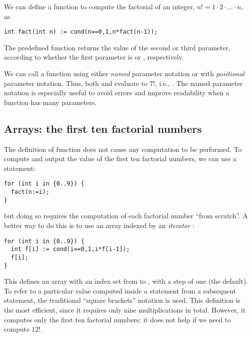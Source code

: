 We can define a function to compute the factorial of an integer,
$n! = 1 \cdot 2 \cdot \ldots \cdot n$, as
\begin{lstlisting}
int fact(int n) := cond(n==0,1,n*fact(n-1));
\end{lstlisting}
The predefined function  returns the value of the second or
third parameter, according to whether the first parameter is 
or , respectively.

We can call a function using either
\emph{named} parameter notation or with \emph{positional} parameter notation.
Thus, both  and  evaluate to $7!$,
i.e., .
The named parameter notation is especially useful to avoid errors and improve
readability when a function has many parameters.

\subsection{Arrays: the first ten factorial numbers}

The definition of function  does not
cause any computation to be performed.
To compute and output the value of the
first ten factorial numbers, we can use a  statement:
\begin{lstlisting}
for (int i in {0..9}) {
  fact(n:=i);
}
\end{lstlisting}
but doing so requires the computation of each factorial number ``from scratch''.
A better way to do this is to use an array  indexed by an
\emph{iterator} :
\begin{lstlisting}
for (int i in {0..9}) {
  int f[i] := cond(i==0,1,i*f[i-1]);
  f[i];
}
\end{lstlisting}
This defines an array  with an index set from  to ,
with a step of one (the default).  To refer to a particular value computed
inside a  statement from a subsequent statement, the traditional
``square brackets'' notation is used.  
This definition is the most efficient, since it requires only nine
multiplications in total.
However, it computes only the first ten factorial numbers:
it does not help if we need to compute $12!$.

